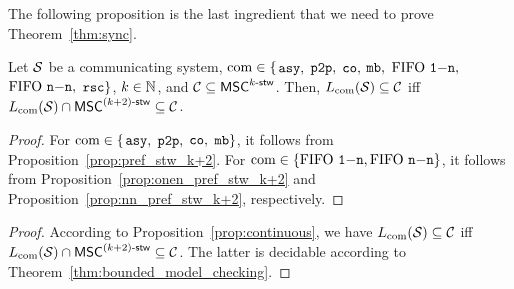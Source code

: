 The following proposition is the last ingredient that we need to prove Theorem~\ref{thm:sync}.

\begin{proposition}\label{prop:continuous}
	Let $\mathcal{S}$ be a communicating system, $\textup{com} \in \{$$\mathtt{asy}, $ $\mathtt{p2p}, $ $\mathtt{co}, $ $\mathtt{mb}, $ $\text{FIFO } \mathtt{1\mathsf{-}n}, $ $\text{FIFO } \mathtt{n\mathsf{-}n}, $ $\mathtt{rsc}\}$,
	$k \in \mathbb{N}$, and $\mathcal{C} \subseteq \mathsf{MSC}^{k\textup{-}\mathsf{stw}}$.
	Then, $L_{\textup{com}}(\mathcal{S}) \subseteq \mathcal{C}$ iff
	$L_{\textup{com}}(\mathcal{S}) \cap \mathsf{MSC}^{(k+2)\textup{-}\mathsf{stw}} \subseteq \mathcal{C}$.
\end{proposition}
\begin{proof}
For $\textup{com} \in \{$$\mathtt{asy}, $ $\mathtt{p2p}, $ $\mathtt{co}, $ $\mathtt{mb}\}$, it follows from Proposition~\ref{prop:pref_stw_k+2}. For $\textup{com} \in \{\text{FIFO } \mathtt{1\mathsf{-}n}, \text{FIFO } \mathtt{n\mathsf{-}n}\}$, it follows from Proposition~\ref{prop:onen_pref_stw_k+2} and Proposition~\ref{prop:nn_pref_stw_k+2}, respectively.
\end{proof}

\thmsync*
\begin{proof}
    According to Proposition~\ref{prop:continuous}, we have $L_{\textup{com}}(\mathcal{S}) \subseteq \mathcal{C}$ iff
	$L_{\textup{com}}(\mathcal{S}) \cap \mathsf{MSC}^{(k+2)\textup{-}\mathsf{stw}} \subseteq \mathcal{C}$. The latter is decidable according to Theorem~\ref{thm:bounded_model_checking}.
\end{proof}


